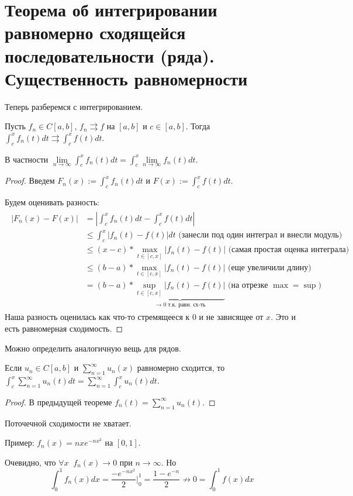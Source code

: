 \section{Теорема об интегрировании равномерно сходящейся последовательности (ряда). Существенность равномерности}
Теперь разберемся с интегрированием.

\begin{theorem}
    Пусть $f_n \in C[a, b]$, $f_n \rightrightarrows f$ на $[a, b]$ и $c \in [a, b]$. 
    Тогда $\int_c^x f_n(t)dt \rightrightarrows \int_c^x f(t)dt$.

    В частности $\lim\limits_{n \to \infty} \int_c^x f_n(t)dt = \int_c^x \lim\limits_{n \to \infty} f_n(t)dt$.
\end{theorem}

\begin{proof}
    Введем $F_n(x) := \int_c^x f_n(t)dt$ и $F(x) := \int_c^x f(t)dt $. 
    
    \quad Будем оценивать разность:
    \begin{gather*}
        \begin{split}
            |F_n(x) - F(x)| &= \left|\int_c^x f_n(t)dt - \int_c^x f(t)dt \right| \\
            &\leqslant \int_c^x |f_n(t) - f(t)|dt \text{ (занесли под один интеграл и внесли модуль) } \\
            &\leqslant (x - c) * \max_{t \in [c, x]} |f_n(t) - f(t)| \text{ (самая простая оценка интеграла) } \\
            &\leqslant (b - a) * \max_{t \in [c, x]} |f_n(t) - f(t)| \text{ (еще увеличили длину) }\\
            &= (b - a) * \underbrace{\sup_{t \in [c, x]} |f_n(t) - f(t)|}_{\to 0 \text{ т.к. равн. сх-ть}} \text{ (на отрезке $\max = \sup$) }
        \end{split}
    \end{gather*}
    Наша разность оценилась как что-то стремящееся к 0 и не зависящее от $x$. Это и есть равномерная сходимость.
\end{proof}

\vspace*{7mm}

Можно определить аналогичную вещь для рядов.

\begin{follow}
    Если $u_n \in C[a, b]$ и $\sum\limits_{n=1}^\infty u_n(x)$ равномерно сходится, то $\int_c^x \sum\limits_{n=1}^\infty u_n(t) dt = \sum\limits_{n=1}^\infty \int_c^x u_n(t) dt$.
\end{follow}
\begin{proof}
    В предыдущей теореме $f_n(t) = \sum\limits_{n=1}^\infty u_n(t)$.
\end{proof}

\begin{notice}
    Поточечной сходимости не хватает.
    
    \quad Пример: $f_n(x) = nxe^{-nx^2}$ на $[0, 1]$.

    \quad Очевидно, что $\forall x \;\; f_n(x) \to 0$ при $n \to \infty$. Но \[ \int_0^1 f_n(x)dx = \frac{-e^{-nx^2}}{2}\Big|_0^1 = \frac{1 - e^{-n}}{2} \nrightarrow 0 = \int_0^1 f(x)dx \]
\end{notice}
